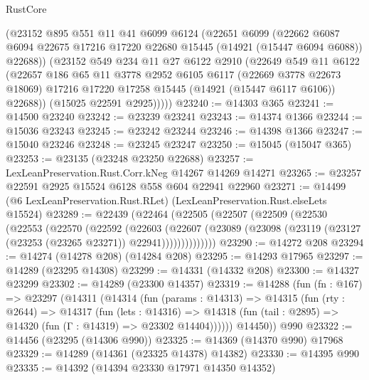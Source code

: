 \begin{lexlean}{RustCore}
\begin{coremodule}
        (@23152
          @895
          @551
          @11
          @41
          @6099
          @6124
          (@22651
            @6099
            (@22662
              @6087
              @6094
              @22675
              @17216
              @17220
              @22680
              @15445
              (@14921 (@15447 @6094 @6088))
              @22688))
          (@23152
            @549
            @234
            @11
            @27
            @6122
            @2910
            (@22649
              @549
              @11
              @6122
              (@22657
                @186
                @65
                @11
                @3778
                @2952
                @6105
                @6117
                (@22669 @3778 @22673 @18069)
                @17216
                @17220
                @17258
                @15445
                (@14921 (@15447 @6117 @6106))
                @22688))
            (@15025 @22591 @2925)))))
@23240 := @14303 @365
@23241 := @14500 @23240
@23242 := @23239 @23241
@23243 := @14374 @1366
@23244 := @15036 @23243
@23245 := @23242 @23244
@23246 := @14398 @1366
@23247 := @15040 @23246
@23248 := @23245 @23247
@23250 := @15045 (@15047 @365)
@23253 := @23135 (@23248 @23250 @22688)
@23257 := LexLeanPreservation.Rust.Corr.kNeg @14267 @14269 @14271
@23265 := @23257 @22591 @2925 @15524 @6128 @558 @604 @22941 @22960
@23271 := @14499 (@6 LexLeanPreservation.Rust.RLet) (LexLeanPreservation.Rust.elseLets @15524)
@23289 := @22439
    (@22464
      (@22505
        (@22507
          (@22509
            (@22530
              (@22553
                (@22570
                  (@22592
                    (@22603
                      (@22607
                        (@23089
                          (@23098 (@23119 (@23127 (@23253 (@23265 @23271)) @22941))))))))))))))
@23290 := @14272 @208
@23294 := @14274 (@14278 @208) (@14284 @208)
@23295 := @14293 @17965
@23297 := @14289 (@23295 @14308)
@23299 := @14331 (@14332 @208)
@23300 := @14327 @23299
@23302 := @14289 (@23300 @14357)
@23319 := @14288
    (fun (fn : @167) =>
    @23297
      (@14311
        (@14314
          (fun (params : @14313) =>
          @14315
            (fun (rty : @2644) =>
            @14317
              (fun (lets : @14316) =>
              @14318 (fun (tail : @2895) => @14320 (fun (Γ : @14319) => @23302 @14404))))))
        @14450))
    @990
@23322 := @14456 (@23295 (@14306 @990))
@23325 := @14369 (@14370 @990) @17968
@23329 := @14289 (@14361 (@23325 @14378) @14382)
@23330 := @14395 @990
@23335 := @14392 (@14394 @23330 @17971 @14350 @14352)

\end{coremodule}
\end{lexlean}
